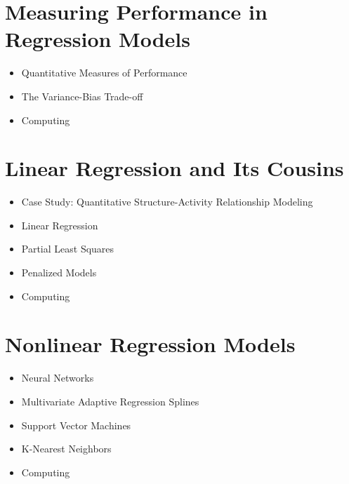 
\section{Measuring Performance in Regression Models} 
\begin{itemize}
\item Quantitative Measures of Performance 
\item The Variance-Bias Trade-off  
\item Computing 
\end{itemize} 

\section{Linear Regression and Its Cousins} 
\begin{itemize}
\item Case Study: Quantitative Structure-Activity Relationship
Modeling  
\item Linear Regression  
\item Partial Least Squares 
\item Penalized Models  
\item Computing 
\end{itemize} 

\section{Nonlinear Regression Models} 
\begin{itemize}
\item Neural Networks  
\item Multivariate Adaptive Regression Splines 
\item Support Vector Machines 
\item K-Nearest Neighbors 
\item Computing 
\end{itemize} 

